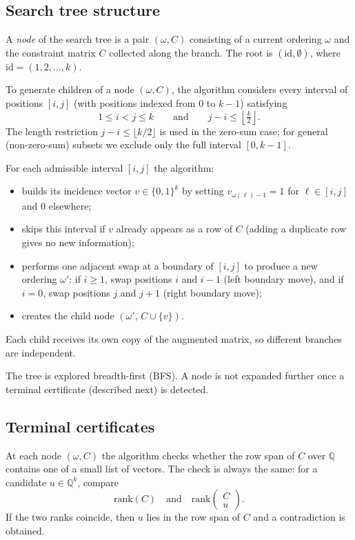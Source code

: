 \documentclass[11pt]{amsart}
\theoremstyle{definition}
\begin{document}
\subsection*{Search tree structure}

A \emph{node} of the search tree is a pair $(\omega,C)$ consisting of a current
ordering $\omega$ and the constraint matrix $C$ collected along the branch.
The root is $(\mathrm{id},\emptyset)$, where $\mathrm{id}=(1,2,\dots,k)$.

To generate children of a node $(\omega,C)$, the algorithm considers every
interval of positions $[i,j]$ (with positions indexed from $0$ to $k-1$)
satisfying
\[
1 \le i < j \le k
\qquad\text{and}\qquad
j-i \le \left\lfloor\tfrac{k}{2}\right\rfloor.
\]
The length restriction $j-i\le\lfloor k/2\rfloor$ is used in the zero-sum case;
for general (non-zero-sum) subsets we exclude only the full interval $[0,k-1]$.

For each admissible interval $[i,j]$ the algorithm:
\begin{itemize}
	\item builds its incidence vector $v\in\{0,1\}^k$ by setting
	$v_{\omega(\ell)-1}=1$ for $\ell\in[i,j]$ and $0$ elsewhere;
	\item skips this interval if $v$ already appears as a row of $C$
	(adding a duplicate row gives no new information);
	\item performs one adjacent swap at a boundary of $[i,j]$ to produce a new
	ordering $\omega'$:
	if $i\ge 1$, swap positions $i$ and $i-1$ (left boundary move), and if $i=0$,
	swap positions $j$ and $j+1$ (right boundary move);
	\item creates the child node $(\omega',\,C\cup\{v\})$.
\end{itemize}
Each child receives its own copy of the augmented matrix, so different branches
are independent.

The tree is explored breadth-first (BFS).  A node is not expanded further once
a terminal certificate (described next) is detected.

\subsection*{Terminal certificates}

At each node $(\omega,C)$ the algorithm checks whether the row span of $C$ over
$\mathbb{Q}$ contains one of a small list of vectors.  The check is always the
same: for a candidate $u\in\mathbb{Q}^k$, compare
\[
\text{rank}(C)\quad\text{and}\quad \text{rank}\!\begin{pmatrix}C\\u\end{pmatrix}.
\]
If the two ranks coincide, then $u$ lies in the row span of $C$ and a
contradiction is obtained.
\end{document}

